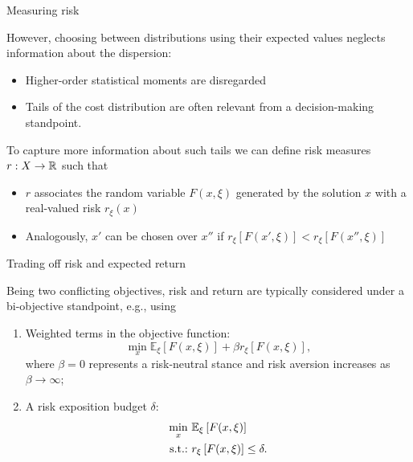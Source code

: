 \begin{frame}{Measuring risk}

	However, choosing between distributions using their expected values neglects \alert{information about the dispersion}:
	\begin{itemize}
		\item Higher-order statistical moments are disregarded
		\item \alert{Tails} of the cost distribution are often relevant from a decision-making standpoint.	
	\end{itemize}
	
	\pause
	To capture more information about such tails we can define \alert{risk measures} $r : X \to \mathbb R$ such that
		\begin{itemize}
			\item $r$ associates the random variable $F(x, \xi)$ generated by the solution $x$ with a \alert{real-valued risk} $r_\xi(x)$
			\item Analogously, $x'$ can be chosen over $x''$ if $r_\xi\left[F(x', \xi)\right] < r_\xi\left[F(x'', \xi)\right]$
		\end{itemize}
	
\end{frame}


\begin{frame}{Trading off risk and expected return}

	Being \alert{two conflicting objectives}, risk and return are typically considered under a bi-objective standpoint, e.g., using
	\begin{enumerate}[<+->]
		\item \alert{Weighted terms} in the objective function:
		\begin{equation*}	
				\min_x  \mathbb{E}_\xi\left[F(x,\xi)\right] + \beta r_\xi\left[F(x, \xi)\right],
		\end{equation*}
		where $\beta = 0$ represents a risk-neutral stance and risk aversion increases as $\beta \to \infty$;
		\item A \alert{risk exposition budget} $\delta$:
		\begin{align*}	
				\min_x~ & \mathbb{E}_\xi\left[F(x,\xi)\right] \\
				\mathop{\text{s.t.:} \ } & r_\xi\left[F(x, \xi)\right] \le \delta. 
		\end{align*}
	\end{enumerate}
		
\end{frame}


